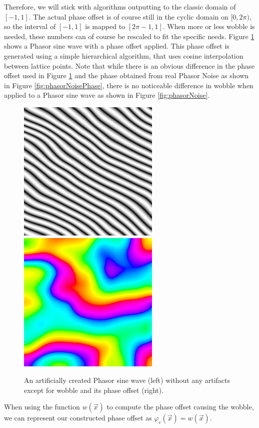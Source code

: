 \documentclass{utue} %
\begin{document}
Therefore, we will stick with algorithms outputting to the classic domain of $[-1,1]$. The actual phase offset is of course still in the cyclic domain on $[0,2\pi)$, so the interval of $[-1,1]$ is mapped to $[2\pi-1,1]$. When more or less wobble is needed, these numbers can of course be rescaled to fit the specific needs. Figure \ref{fig:wobble} shows a Phasor sine wave with a phase offset applied. This phase offset is generated using a simple hierarchical algorithm, that uses cosine interpolation between lattice points. Note that while there is an obvious difference in the phase offset used in Figure \ref{fig:wobble} and the phase obtained from real Phasor Noise as shown in Figure \ref{fig:phasorNoisePhase}, there is no noticeable difference in wobble when applied to a Phasor sine wave as shown in Figure \ref{fig:phasorNoise}.
\begin{figure}[h]
  \centering
  \includegraphics[width=0.49\linewidth]{images/wobble}
  \includegraphics[width=0.49\linewidth]{images/wobblePhase}
  \caption{An artificially created Phasor sine wave (left) without any artifacts except for wobble and its phase offset (right).}\label{fig:wobble}
\end{figure}
When using the function $w(\vec{x})$ to compute the phase offset causing the wobble, we can represent our constructed phase offset as $\varphi_c(\vec{x}) = w(\vec{x})$.
\end{document}
